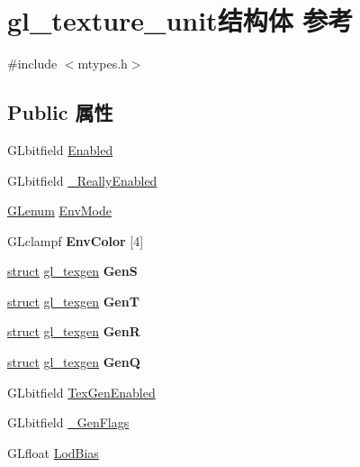 \hypertarget{structgl__texture__unit}{}\section{gl\+\_\+texture\+\_\+unit结构体 参考}
\label{structgl__texture__unit}


{\ttfamily \#include $<$mtypes.\+h$>$}

\subsection*{Public 属性}
\begin{DoxyCompactItemize}
\item 
G\+Lbitfield \hyperlink{structgl__texture__unit_a758637cfe342d7806ded54d6874a55e7}{Enabled}
\item 
G\+Lbitfield \hyperlink{structgl__texture__unit_afd0ba9b128aba251c3c5ba293af91449}{\+\_\+\+Really\+Enabled}
\item 
\hyperlink{interfacevoid}{G\+Lenum} \hyperlink{structgl__texture__unit_ac318a89847b6c5a028ed920a36fe5029}{Env\+Mode}
\item 
\mbox{\label{structgl__texture__unit_ab0fd84d1a90f05f18df9e9c25ab5e425}} 
G\+Lclampf {\bfseries Env\+Color} \mbox{[}4\mbox{]}
\item 
\mbox{\label{structgl__texture__unit_a74e40f648d3dc5d24170dd9b12a5cda2}} 
\hyperlink{interfacestruct}{struct} \hyperlink{structgl__texgen}{gl\+\_\+texgen} {\bfseries GenS}
\item 
\mbox{\label{structgl__texture__unit_a638f814615f57ea15c95e1fc850949a4}} 
\hyperlink{interfacestruct}{struct} \hyperlink{structgl__texgen}{gl\+\_\+texgen} {\bfseries GenT}
\item 
\mbox{\label{structgl__texture__unit_afd07d3a6ef1c01369f6207ba8ea3a992}} 
\hyperlink{interfacestruct}{struct} \hyperlink{structgl__texgen}{gl\+\_\+texgen} {\bfseries GenR}
\item 
\mbox{\label{structgl__texture__unit_a0501d3533b027aa31acf0fcd9858adab}} 
\hyperlink{interfacestruct}{struct} \hyperlink{structgl__texgen}{gl\+\_\+texgen} {\bfseries GenQ}
\item 
G\+Lbitfield \hyperlink{structgl__texture__unit_a0b23831e8691b933d73bc65cb0e7860a}{Tex\+Gen\+Enabled}
\item 
G\+Lbitfield \hyperlink{structgl__texture__unit_aab34963540ccb22d80e28accdbd13afb}{\+\_\+\+Gen\+Flags}
\item 
G\+Lfloat \hyperlink{structgl__texture__unit_a7fa1327fe818faaf0309b1320e594b13}{Lod\+Bias}
\end{DoxyCompactItemize}
